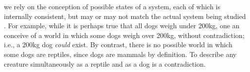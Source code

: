 \documentclass[twocolumn,10pt]{asme2ej}
\begin{document}
%
%
%
we rely on the conception of possible states of a system, each of which is internally consistent, but may or may not match the actual system being studied \cite{Adams1974,Lewis1986}. 
%
%
For example, while it is perhaps true that all dogs weigh under 200kg, one an conceive of a world in which some dogs weigh over 200kg, without contradiction; i.e., a 200kg dog \textit{could} exist. By contrast, there is no possible world in which some dogs are reptiles, since dogs are mammals by definition. To describe any creature simultaneously as a reptile and as a dog is a contradiction.
\end{document}
